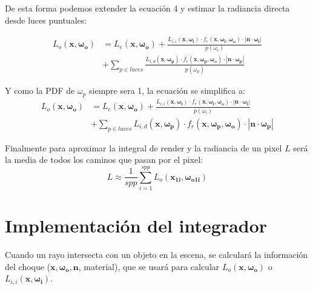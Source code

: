 \documentclass{article}
\begin{document}
De esta forma podemos extender la ecuación 4 y estimar la radiancia directa desde
luces puntuales:

\begin{equation}
  \begin{split}
    L_o(\mathbf{x}, \mathbf{\omega_{o}}) & = L_e(\mathbf{x}, \mathbf{\omega_{o}}) + \frac{L_{i,i}(\mathbf{x}, \mathbf{\omega_{i}}) \cdot f_r(\mathbf{x}, \mathbf{\omega_{i}}, \mathbf{\omega_{o}}) \cdot  |\mathbf{n} \cdot \mathbf{\omega_{i}}|}{p(\omega_{i})} \\
                                         & + \sum_{p \in luces} \frac{L_{i,d}(\mathbf{x}, \mathbf{\omega_{p}}) \cdot f_r(\mathbf{x}, \mathbf{\omega_{p}}, \mathbf{\omega_{o}}) \cdot  |\mathbf{n} \cdot \mathbf{\omega_{p}}|}{p(\omega_{p})}
  \end{split}
\end{equation}

Y como la PDF de \(\omega_{p}\) siempre sera 1, la ecuación se simplifica a:
\begin{equation}
  \begin{split}
    L_o(\mathbf{x}, \mathbf{\omega_{o}}) & = L_e(\mathbf{x}, \mathbf{\omega_{o}}) + \frac{L_{i,i}(\mathbf{x}, \mathbf{\omega_{i}}) \cdot f_r(\mathbf{x}, \mathbf{\omega_{i}}, \mathbf{\omega_{o}}) \cdot  |\mathbf{n} \cdot \mathbf{\omega_{i}}|}{p(\omega_{i})} \\
                                         & + \sum_{p \in luces} L_{i,d}(\mathbf{x}, \mathbf{\omega_{p}}) \cdot f_r(\mathbf{x}, \mathbf{\omega_{p}}, \mathbf{\omega_{o}}) \cdot  |\mathbf{n} \cdot \mathbf{\omega_{p}}|
  \end{split}
\end{equation}

Finalmente para aproximar la
integral de render y la radiancia de un pixel \(L\) será la media de todos los
caminos que pasan por el pixel:
\begin{equation}
  L \approx \frac{1}{spp} \sum_{i=1}^{spp} L_{o}(\mathbf{x_{1i}}, \mathbf{\omega_{o1i}})
\end{equation}

\section{Implementación del integrador}
Cuando un rayo intersecta con un objeto en la escena, se calculará la
información del choque (\(\mathbf{x}, \mathbf{\omega_{o}}, \mathbf{n}\),
material), que se usará para calcular \(L_o(\mathbf{x}, \mathbf{\omega_{o}})\) o
\(L_{i,i}(\mathbf{x}, \mathbf{\omega_{i}}) \).
\end{document}
